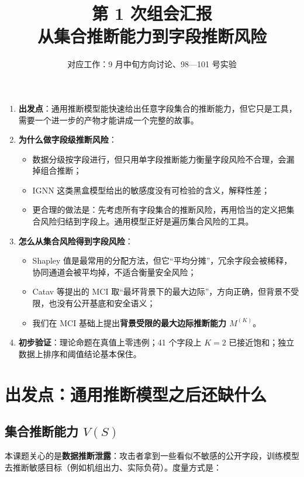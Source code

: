 \documentclass[zihao=-4,a4paper]{ctexart}
\title{\textbf{第 1 次组会汇报}\\[4pt]\Large 从集合推断能力到字段推断风险}
\author{对应工作：9 月中旬方向讨论、98—101 号实验}
\date{}
\newcommand{\M}{M^{(K)}}
\begin{document}
\maketitle
\thispagestyle{empty}

\begin{keybox}
\begin{enumerate}[leftmargin=*]
  \item \textbf{出发点}：通用推断模型能快速给出任意字段集合的推断能力，但它只是工具，需要一个进一步的产物才能讲成一个完整的故事。
  \item \textbf{为什么做字段级推断风险}：
    \begin{itemize}
      \item 数据分级按字段进行，但只用单字段推断能力衡量字段风险不合理，会漏掉组合推断；
      \item IGNN 这类黑盒模型给出的敏感度没有可检验的含义，解释性差；
      \item 更合理的做法是：先考虑所有字段集合的推断风险，再用恰当的定义把集合风险归结到字段上。通用模型正好是遍历集合风险的工具。
    \end{itemize}
  \item \textbf{怎么从集合风险得到字段风险}：
    \begin{itemize}
      \item Shapley 值是最常用的分配方法，但它“平均分摊”，冗余字段会被稀释，协同通道会被平均掉，不适合衡量安全风险；
      \item Catav 等提出的 MCI 取“最坏背景下的最大边际”，方向正确，但背景不受限，也没有公开基底和安全语义；
      \item 我们在 MCI 基础上提出\textbf{背景受限的最大边际推断能力 $\M$}。
    \end{itemize}
  \item \textbf{初步验证}：理论命题在真值上零违例；41 个字段上 $K=2$ 已接近饱和；独立数据上排序和阈值结论基本保住。
\end{enumerate}
\end{keybox}

\section{出发点：通用推断模型之后还缺什么}

\subsection{集合推断能力 $V(S)$}

本课题关心的是\textbf{数据推断泄露}：攻击者拿到一些看似不敏感的公开字段，训练模型去推断敏感目标（例如机组出力、实际负荷）。度量方式是：
\end{document}
